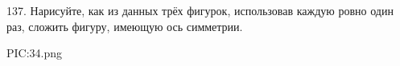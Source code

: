 137. Нарисуйте, как из данных трёх фигурок, использовав каждую ровно один раз, сложить фигуру, имеющую ось симметрии.
\begin{center}
{{PIC:34.png}}
\end{center}
